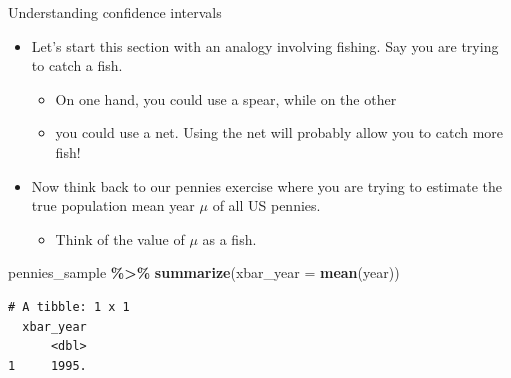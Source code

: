 \documentclass[
  ignorenonframetext,
]{beamer}
\newenvironment{Shaded}{\begin{snugshade}}{\end{snugshade}}
\newcommand{\AttributeTok}[1]{\textcolor[rgb]{0.13,0.29,0.53}{#1}}
\newcommand{\FunctionTok}[1]{\textcolor[rgb]{0.13,0.29,0.53}{\textbf{#1}}}
\newcommand{\NormalTok}[1]{#1}
\newcommand{\SpecialCharTok}[1]{\textcolor[rgb]{0.81,0.36,0.00}{\textbf{#1}}}
\providecommand{\tightlist}{%
  \setlength{\itemsep}{0pt}\setlength{\parskip}{0pt}}
\begin{document}
\begin{frame}[fragile]{Understanding confidence intervals}
\protect\hypertarget{understanding-confidence-intervals-1}{}
\begin{itemize}
\item
  Let's start this section with an analogy involving fishing. Say you
  are trying to catch a fish.

  \begin{itemize}
  \tightlist
  \item
    On one hand, you could use a spear, while on the other
  \item
    you could use a net. Using the net will probably allow you to catch
    more fish!
  \end{itemize}
\item
  Now think back to our pennies exercise where you are trying to
  estimate the true population mean year \(\mu\) of all US pennies.

  \begin{itemize}
  \tightlist
  \item
    Think of the value of \(\mu\) as a fish.
  \end{itemize}
\end{itemize}

\begin{Shaded}
\begin{Highlighting}[]
\NormalTok{pennies\_sample }\SpecialCharTok{\%\textgreater{}\%} 
  \FunctionTok{summarize}\NormalTok{(}\AttributeTok{xbar\_year =} \FunctionTok{mean}\NormalTok{(year))}
\end{Highlighting}
\end{Shaded}

\begin{verbatim}
# A tibble: 1 x 1
  xbar_year
      <dbl>
1     1995.
\end{verbatim}
\end{frame}
\end{document}
